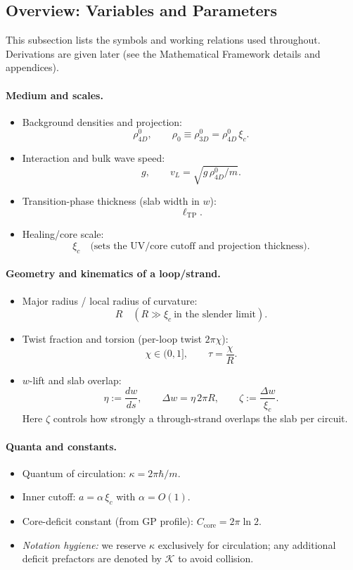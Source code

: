 \medskip

\subsection{Overview: Variables and Parameters}

This subsection lists the symbols and working relations used throughout. Derivations are given later (see the Mathematical Framework details and appendices).

\paragraph{Medium and scales.}
\begin{itemize}
  \item Background densities and projection:
  \[
  \rho_{4D}^0,\qquad \rho_0\equiv \rho_{3D}^0=\rho_{4D}^0\,\xi_c.
  \]
  \item Interaction and bulk wave speed:
  \[
  g,\qquad v_L=\sqrt{g\,\rho_{4D}^0/m}.
  \]
  \item Transition-phase thickness (slab width in $w$):
  \[
  \ell_{\mathrm{TP}}.
  \]
  \item Healing/core scale:
  \[
  \xi_c \quad \text{(sets the UV/core cutoff and projection thickness)}.
  \]
\end{itemize}

\paragraph{Geometry and kinematics of a loop/strand.}
\begin{itemize}
  \item Major radius / local radius of curvature:
  \[
  R\quad (R\gg \xi_c\ \text{in the slender limit}).
  \]
  \item Twist fraction and torsion (per-loop twist $2\pi\chi$):
  \[
  \chi\in(0,1],\qquad \tau=\frac{\chi}{R}.
  \]
  \item $w$-lift and slab overlap:
  \[
  \eta:=\frac{dw}{ds},\qquad \Delta w= \eta\,2\pi R,\qquad
  \zeta:=\frac{\Delta w}{\xi_c}.
  \]
  Here $\zeta$ controls how strongly a through-strand overlaps the slab per circuit.
\end{itemize}

\paragraph{Quanta and constants.}
\begin{itemize}
  \item Quantum of circulation: $\kappa=2\pi\hbar/m$.
  \item Inner cutoff: $a=\alpha\,\xi_c$ with $\alpha=O(1)$.
  \item Core-deficit constant (from GP profile): $C_{\mathrm{core}}=2\pi\ln 2$.
  \item \emph{Notation hygiene:} we reserve $\kappa$ exclusively for circulation; any additional deficit prefactors are denoted by $\mathcal{K}$ to avoid collision.
\end{itemize}

